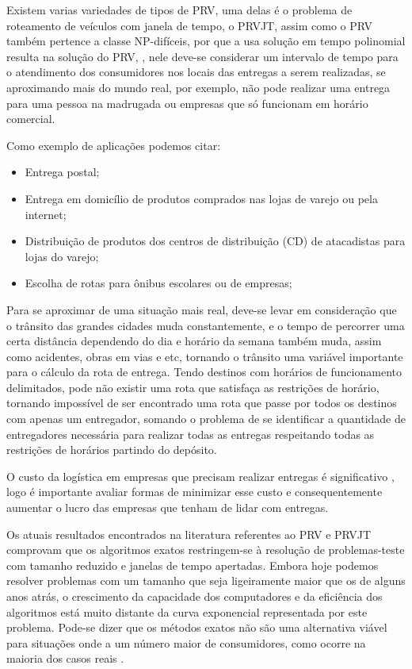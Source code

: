 Existem varias variedades de tipos de PRV, uma delas é o problema de roteamento de veículos com janela de tempo, o PRVJT, assim como o PRV também pertence a classe NP-difíceis, por que a usa solução em tempo polinomial resulta na solução do PRV, , nele deve-se considerar um intervalo de tempo para o atendimento dos consumidores nos locais das entregas a serem realizadas, se aproximando mais do mundo real, por exemplo, não pode realizar uma entrega para uma pessoa na madrugada ou empresas que só funcionam em horário comercial. 

Como exemplo de aplicações podemos citar:
\begin{itemize}
	\item Entrega postal;
	\item Entrega em domicílio de produtos comprados nas lojas de varejo ou pela internet;
	\item Distribuição de produtos dos centros de distribuição (CD) de atacadistas para lojas do varejo;
	\item Escolha de rotas para ônibus escolares ou de empresas;
\end{itemize}

Para se aproximar de uma situação mais real, deve-se levar em consideração que o trânsito das grandes cidades muda constantemente, e o tempo de percorrer uma certa distância dependendo do dia e horário da semana também muda, assim como acidentes, obras em vias e etc, tornando o trânsito uma variável importante para o cálculo da rota de entrega. Tendo destinos com horários de funcionamento delimitados, pode não existir uma rota que satisfaça as restrições de horário, tornando impossível de ser encontrado uma rota que passe por todos os destinos com apenas um entregador, somando o problema de se identificar a quantidade de entregadores necessária para realizar todas as entregas respeitando todas as restrições de horários partindo do depósito. 

O custo da logística em empresas que precisam realizar entregas é significativo \cite{RODRIGUES}, logo é importante avaliar formas de minimizar esse custo e consequentemente aumentar o lucro das empresas que tenham de lidar com entregas.

Os atuais resultados encontrados na literatura referentes ao PRV e PRVJT comprovam que os algoritmos exatos restringem-se à resolução de problemas-teste com tamanho reduzido e janelas de tempo apertadas. Embora hoje podemos resolver problemas com um tamanho que seja ligeiramente maior que os de alguns anos atrás, o crescimento da capacidade dos computadores e da eficiência dos algoritmos está muito distante da curva exponencial representada por este problema. Pode-se dizer que os métodos exatos não são uma alternativa viável para situações onde a um número maior de consumidores, como ocorre na maioria dos casos reais \cite{Chabrier}.

